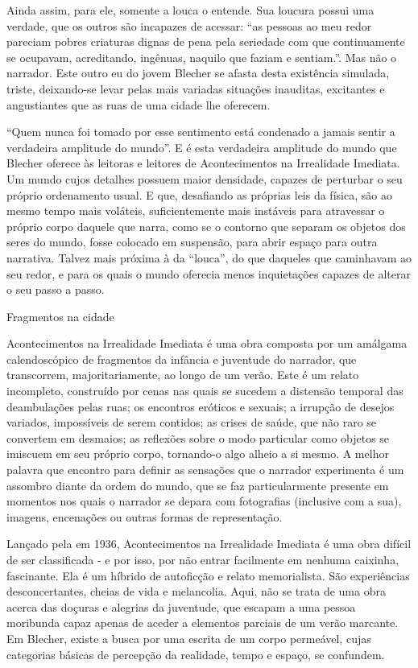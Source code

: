 Ainda assim, para ele, somente a louca o entende. Sua loucura possui uma verdade, que os outros são incapazes de acessar: “as pessoas ao meu redor pareciam pobres criaturas dignas de pena pela seriedade com que continuamente se ocupavam, acreditando, ingênuas, naquilo que faziam e sentiam.”. Mas não o narrador. Este outro eu do jovem Blecher se afasta desta existência simulada, triste, deixando-se levar pelas mais variadas situações inauditas, excitantes e angustiantes que as ruas de uma cidade lhe oferecem. 

“Quem nunca foi tomado por esse sentimento está condenado a jamais sentir a verdadeira amplitude do mundo”. E é esta verdadeira amplitude do mundo que Blecher oferece às leitoras e leitores de Acontecimentos na Irrealidade Imediata. Um mundo cujos detalhes possuem maior densidade, capazes de perturbar o seu próprio ordenamento usual. E que, desafiando as próprias leis da física, são ao mesmo tempo mais voláteis, suficientemente mais instáveis para atravessar o próprio corpo daquele que narra, como se o contorno que separam os objetos dos seres do mundo, fosse colocado em suspensão, para abrir espaço para outra narrativa. Talvez mais próxima à da “louca”, do que daqueles que caminhavam ao seu redor, e para os quais o mundo oferecia menos inquietações capazes de alterar o seu passo a passo.


Fragmentos na cidade

Acontecimentos na Irrealidade Imediata é uma obra composta por um amálgama calendoscópico de fragmentos da infância e juventude do narrador, que transcorrem, majoritariamente, ao longo de um verão. Este é um relato incompleto, construído por cenas nas quais se sucedem a distensão temporal das deambulações pelas ruas; os encontros eróticos e sexuais; a irrupção de desejos variados, impossíveis de serem contidos; as crises de saúde, que não raro se convertem em desmaios; as reflexões sobre o modo particular como objetos se imiscuem em seu próprio corpo, tornando-o algo alheio a si mesmo. A melhor palavra que encontro para definir as sensações que o narrador experimenta é um assombro diante da ordem do mundo, que se faz particularmente presente em momentos nos quais o narrador se depara com fotografias (inclusive com a sua), imagens, encenações ou outras formas de representação.

Lançado pela em 1936, Acontecimentos na Irrealidade Imediata é uma obra difícil de ser classificada - e por isso, por não entrar facilmente em nenhuma caixinha, fascinante. Ela é um híbrido de autoficção e relato memorialista. São experiências desconcertantes, cheias de vida e melancolia. Aqui, não se trata de uma obra acerca das doçuras e alegrias da juventude, que escapam a uma pessoa moribunda capaz apenas de aceder a elementos parciais de um verão marcante. Em Blecher, existe a busca por uma escrita de um corpo permeável, cujas categorias básicas de percepção da realidade, tempo e espaço, se confundem.

